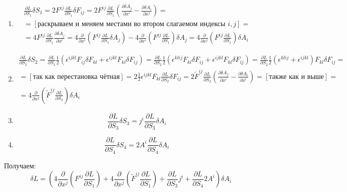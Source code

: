 \begin{enumerate}
	\item 
	\[
		\begin{gathered}
		\frac{\partial L}{\partial S_1} \delta S_1 = 2 F^{ij} \frac{\partial L}{\partial S_1} \delta F_{ij} = 
		2 F^{ij} \frac{\partial L}{\partial S_1} \left(\frac{\partial \delta A_j}{\partial x^i} - \frac{\partial \delta A_i}{\partial x^j} \right)
		= \\ =
		[\text{раскрываем и меняем местами во втором слагаемом индексы $i, j$} ] = \\ =
		4 F^{ij} \frac{\partial L}{\partial S_1} \frac{\partial \delta A_j}{\partial x^i} = 
		4 \frac{\partial }{\partial x^i} \left(F^{ij} \frac{\partial L}{\partial S_1} \delta A_j \right) - 4 \frac{\partial}{\partial x^i} \left(F^{ij} \frac{\partial L}{\partial S_1} \right) \delta A_j =
		4 \frac{\partial}{\partial x^j} \left(F^{ij} \frac{\partial L}{\partial S_1} \right) \delta A_i
		\end{gathered}
	\]
	\item 
	\[
		\begin{gathered}
		\frac{\partial L}{\partial S_2} \delta S_2 = \frac{\partial L}{\partial S_2} \frac{1}{2}\left(\epsilon^{ijkl} F_{ij} \delta F_{kl} +  \epsilon^{ijkl} F_{kl} \delta F_{ij} \right)
		= \frac{\partial L}{\partial S_2} \frac{1}{2}\left(\epsilon^{klij} F_{kl} \delta F_{ij} +  \epsilon^{ijkl} F_{kl} \delta F_{ij} \right)
		= \frac{\partial L}{\partial S_2} \frac{1}{2}(\epsilon^{klij} + \epsilon^{ijkl}) F_{kl} \delta F_{ij} = 
		\\ =
		[\text{так как перестановка чётная}] 
		= 2 \frac{1}{2} \epsilon^{ijkl} F_{kl} \frac{\partial L}{\partial S_2} \delta F_{ij}
		= 2 \tilde{F}^{ij} \frac{\partial L}{\partial S_2} \left(\frac{\partial \delta A_j}{\partial x^i} - \frac{\partial \delta A_i}{\partial x^i} \right)
		= [\text{также как и выше}] = \\
		= 4 \frac{\partial}{\partial x^j} \left(\tilde{F}^{ij} \frac{\partial L}{\partial S_2} \right) \delta A_i
		\end{gathered}
	\]
	\item
	\[
		\frac{\partial L}{\partial S_3} \delta S_3 = j^i \frac{\partial L}{\partial S_3} \delta A_i
	\]
	\item 
	\[
		\frac{\partial L}{\partial S_4} \delta S_4 = 2 A^i \frac{\partial L}{\partial S_4}  \delta A_i
	\]
\end{enumerate}
Получаем:
\[
	\delta L = 
	\left(
	4 \frac{\partial}{\partial x^j} \left(F^{ij} \frac{\partial L}{\partial S_1} \right) + 
	4 \frac{\partial}{\partial x^j} \left(\tilde{F}^{ij} \frac{\partial L}{\partial S_1} \right) +
	\frac{\partial L}{\partial S_3} j^i + 
	\frac{\partial L}{\partial S_4} 2 A^i
	\right) \delta A_i
\]
